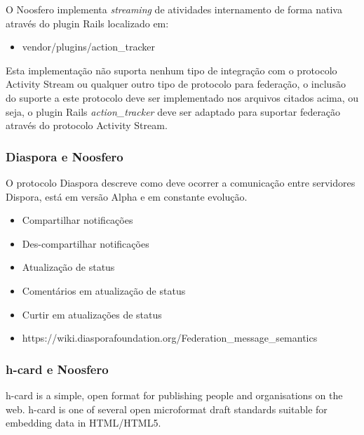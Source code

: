 \documentclass[12pt]{article}
\begin{document}
O Noosfero implementa {\it streaming} de atividades internamento de forma
nativa através do plugin Rails localizado em:

\begin{itemize}
  \item vendor/plugins/action\_tracker
\end{itemize}

Esta implementação não suporta nenhum tipo de integração com o protocolo
Activity Stream ou qualquer outro tipo de protocolo para federação, o inclusão
do suporte a este protocolo deve ser implementado nos arquivos citados acima,
ou seja, o plugin Rails {\it action\_tracker} deve ser adaptado para suportar
federação através do protocolo Activity Stream.


\subsubsection{Diaspora e Noosfero}

O protocolo Diaspora descreve como deve ocorrer a comunicação entre servidores
Dispora, está em versão Alpha e em constante evolução.

\begin{itemize}
  \item Compartilhar notificações
  \item Des-compartilhar notificações
  \item Atualização de status
  \item Comentários em atualização de status
  \item Curtir em atualizações de status
\end{itemize}

\begin{itemize}
  \item https://wiki.diasporafoundation.org/Federation\_message\_semantics
\end{itemize}

\subsubsection{h-card e Noosfero}

h-card is a simple, open format for publishing people and organisations on the web. h-card is one of several open microformat draft standards suitable for embedding data in HTML/HTML5.
\end{document}
